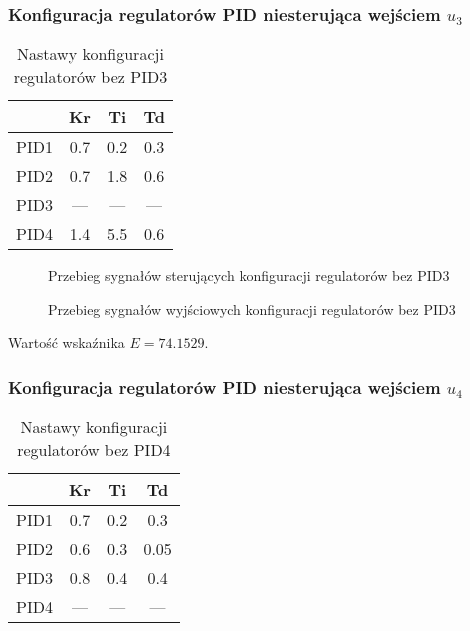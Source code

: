 \subsubsection{Konfiguracja regulatorów PID niesterująca wejściem $u_{3}$}
\begin{table}[H]
    \centering
    \begin{tabular}{|l|c|c|c|}
    \hline
         & Kr  & Ti  & Td  \\ \hline
    PID1 & 0.7 & 0.2 & 0.3 \\ \hline
    PID2 & 0.7 & 1.8 & 0.6  \\ \hline
    PID3 & --- & --- & --- \\ \hline
    PID4 & 1.4 & 5.5 & 0.6 \\ \hline
    \end{tabular}
    \caption[H]{Nastawy konfiguracji regulatorów bez PID3}
\end{table}


\ifdefined\CompileFigures
    \begin{figure}[H] 
        \centering
        
        \caption{Przebieg sygnałów sterujących konfiguracji regulatorów bez PID3}
        \label{projekt:zad4:figure:projzadanie4PIDbezu3u}
    \end{figure}
\fi

\ifdefined\CompileFigures
    \begin{figure}[H] 
        \centering
        
        \caption{Przebieg sygnałów wyjściowych konfiguracji regulatorów bez PID3}
        \label{projekt:zad4:figure:projzadanie4PIDbezu3y}
    \end{figure}
\fi

Wartość wskaźnika $E=\num{74.1529}$.

\newpage
\subsubsection{Konfiguracja regulatorów PID niesterująca wejściem $u_{4}$}

\begin{table}[H]
    \centering
    \begin{tabular}{|l|c|c|c|}
    \hline
         & Kr  & Ti  & Td  \\ \hline
    PID1 & 0.7 & 0.2 & 0.3 \\ \hline
    PID2 & 0.6 & 0.3 & 0.05 \\ \hline
    PID3 & 0.8 & 0.4 & 0.4 \\ \hline
    PID4 & --- & --- & --- \\ \hline
    \end{tabular}
    \caption[H]{Nastawy konfiguracji regulatorów bez PID4}
\end{table}

